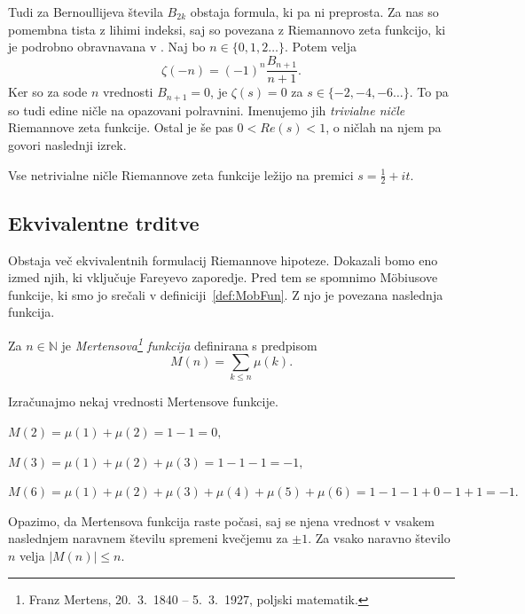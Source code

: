 \documentclass[mat1]{fmfdelo}
\begin{document}
Tudi za Bernoullijeva števila $B_{2k}$ obstaja formula, ki pa ni preprosta.
Za nas so pomembna tista z lihimi indeksi, saj so povezana z Riemannovo zeta funkcijo, ki je podrobno obravnavana v \cite[poglavje 1.5]{zetafunction}. Naj bo $n\in\{0, 1, 2 \dots\}$. Potem velja
\begin{equation}
	\zeta(-n) = (-1)^n \frac{B_{n+1}}{n+1}.
\end{equation}
Ker so za sode $n$ vrednosti $B_{n+1}=0$, je $\zeta(s)=0$ za $s\in\{-2,-4,-6 \dots\}$. To pa so tudi edine ničle na opazovani polravnini. Imenujemo jih \emph{trivialne ničle} Riemannove zeta funkcije. Ostal je še pas $0<Re(s)<1$, o ničlah na njem pa govori naslednji izrek. 

\begin{izrek}
Vse netrivialne ničle Riemannove zeta funkcije ležijo na premici $s=\frac{1}{2}+it$.
\end{izrek}

\subsection{Ekvivalentne trditve}

Obstaja več ekvivalentnih formulacij Riemannove hipoteze. Dokazali bomo eno izmed njih, ki vključuje Fareyevo zaporedje. Pred tem se spomnimo M\"obiusove funkcije, ki smo jo srečali v definiciji~\ref{def:MobFun}. Z njo je povezana naslednja funkcija.

\begin{definicija}
Za $n\in\mathbb{N}$ je \emph{Mertensova\footnote{Franz Mertens, 20.\ 3.\ 1840 -- 5.\ 3.\ 1927, poljski matematik.} funkcija} definirana s predpisom
\begin{equation}
M(n)=\sum_{k\leq n}\mu(k).
\end{equation}
\end{definicija}

\begin{primer}
Izračunajmo nekaj vrednosti Mertensove funkcije.

\( M(2) = \mu(1) + \mu(2) = 1 - 1 = 0, \)

\( M(3) = \mu(1) + \mu(2) + \mu(3) = 1 - 1 - 1 = -1, \)

\( M(6) = \mu(1) + \mu(2) + \mu(3) + \mu(4) + \mu(5) + \mu(6) = 1 - 1 - 1 + 0 - 1 + 1 = -1. \)
\end{primer}

Opazimo, da Mertensova funkcija raste počasi, saj se njena vrednost v vsakem naslednjem naravnem številu spremeni kvečjemu za $\pm 1$. Za vsako naravno število $n$ velja $|M(n)| \leq n$.
\end{document}
